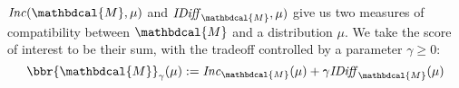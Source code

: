 \documentclass{article}
\theoremstyle{plain}
\theoremstyle{definition}
\theoremstyle{remark}
\newcommand{\thickD}{I\mkern-8muD}
\newcommand{\kldiv}{\thickD\infdivx}
\let\H\relax
\DeclareMathOperator{\H}{\mathrm{H}} %
\DeclareMathOperator*{\E}{\mathbb{E}} %
\newcommand\mat[1]{\mathbf{#1}}
\newcommand\numberthis{\addtocounter{equation}{1}\tag{\theequation}}
\def\sheq{\!=\!}
\newcommand{\bp}[1][L]{\mat{p}_{\!_{#1}\!}}
\newcommand{\Ed}{\mathcal E}
\newcommand{\dg}[1]{\mathbdcal{#1}}
\newcommand{\IBal}[1]{\mathit{IDiff}_{#1}}
\newcommand\extrainfo[2][\dg M]{\IBal[#1](#2)}
\newcommand\Inc{\mathit{Inc}}
\numberwithin{equation}{section}
\begin{document}
$\Inc({\dg M}, \mu)$ and $\IBal{\dg M},\mu)$ give us two measures
of compatibility between ${\dg M}$ and a distribution $\mu$.
We take the score of interest to be their sum, with the tradeoff
        controlled by a parameter $\gamma \ge 0$:
        \begin{equation}
	  \bbr{\dg M}_\gamma(\mu)
	 := \Inc_{\dg M}(\mu) + \gamma \IBal{\dg M}(\mu)
                \label{eqn:full-score}
    	\end{equation}
\end{document}
